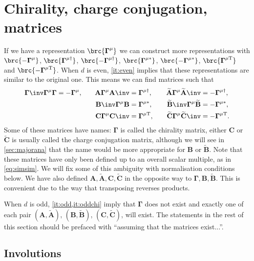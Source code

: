\documentclass[11pt]{article}
\newcommand{\Gammab}{\boldsymbol{\Gamma}}
\newcommand{\mud}{{\mu\dag}}
\newcommand{\mut}{{\mu\mathrm{T}}}
\newcommand{\muc}{{\mu\ast}}
\newcommand{\A}{\mathbf{A}}
\newcommand{\B}{\mathbf{B}}
\renewcommand{\C}{\mathbf{C}}
\newcommand{\At}{\widetilde{\A}}
\newcommand{\Bt}{\widetilde{\B}}
\newcommand{\Ct}{\widetilde{\C}}
\begin{document}

\section{Chirality, charge conjugation, \etc matrices}\label{sec:ccmats}


If we have a representation \(\brc{\Gammab^\mu}\) we can construct more representations with \(\brc{-\Gammab^\mu}\), \(\brc{\Gammab^\mud}\), \(\brc{-\Gammab^\mud}\), \(\brc{\Gammab^\muc}\), \(\brc{-\Gammab^\muc}\), \(\brc{\Gammab^\mut}\) and \(\brc{-\Gammab^\mut}\).
When \(d\) is even, \cref{it:even} implies that these representations are similar to the original one.
This means we can find matrices such that
%
\begin{equation}\label{eq:cccmats}
\begin{aligned}
  \Gammab\inv \Gammab^\mu \Gammab &= -\Gammab^\mu, &\quad
  \A  \Gammab^\mu \A\inv  &=  \Gammab^\mud, &\quad
  \At \Gammab^\mu \At\inv &= -\Gammab^\mud, \\ &&
  \B\inv  \Gammab^\mu \B  &=  \Gammab^\muc, &
  \Bt\inv \Gammab^\mu \Bt &= -\Gammab^\muc, \\ &&
  \C  \Gammab^\mu \C\inv  &=  \Gammab^\mut, &
  \Ct \Gammab^\mu \Ct\inv &= -\Gammab^\mut.
\end{aligned}
\end{equation}
%
Some of these matrices have names: \(\Gammab\) is called the chirality matrix, either \(\C\) or \(\Ct\) is usually called the charge conjugation matrix, although we will see in \cref{sec:majorana} that the name would be more appropriate for \(\B\) or \(\Bt\).
Note that these matrices have only been defined up to an overall scalar multiple, as in \cref{eq:simsim}.
We will fix some of this ambiguity with normalisation conditions below.
We have also defined \(\A,\At,\C,\Ct\) in the opposite way to \(\Gammab,\B,\Bt\).
This is convenient due to the way that transposing reverses products.

When \(d\) is odd, \cref{it:odd,it:oddchi} imply that \(\Gammab\) does not exist and exactly one of each pair \((\A, \At)\), \((\B, \Bt)\), \((\C, \Ct)\), will exist.
The statements in the rest of this section should be prefaced with ``assuming that the matrices exist...''.


\subsection{Involutions}\label{sec:invol}
\end{document}
